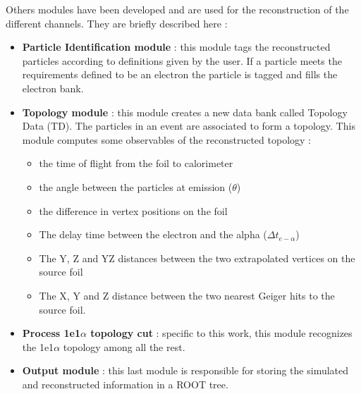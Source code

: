\documentclass[main.tex]{subfiles}
\begin{document}
\noindent Others modules have been developed and are used for the reconstruction of the different channels. They are briefly described here :


\begin{itemize}


\item \textbf{Particle Identification module} : this module tags the reconstructed particles according to definitions given by the user. If a particle meets the requirements defined to be an electron the particle is tagged and fills the electron bank. %


\item \textbf{Topology module} : this module creates a new data bank called Topology Data (TD). The particles in an event are associated to form a topology. This module computes some observables of the reconstructed topology : 

 
\begin{itemize}


\item the time of flight from the foil to calorimeter
\item the angle between the particles at emission ($\theta$)
\item the difference in vertex positions on the foil
\item The delay time between the electron and the alpha ($\Delta t_{e-\alpha}$)
\item The Y, Z and YZ distances between the two extrapolated vertices on the source foil
\item The X, Y and Z distance between the two nearest Geiger hits to the source foil.


\end{itemize}


\item \textbf{Process 1e1$\alpha$ topology cut} : specific to this work, this module recognizes the 1e1$\alpha$ topology among all the rest.%


\item \textbf{Output module} : this last module is responsible for storing the simulated and reconstructed information in a ROOT tree.


\end{itemize}


\FloatBarrier
\end{document}
